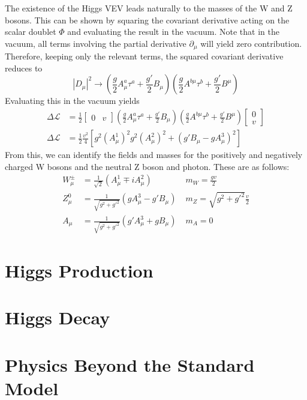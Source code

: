 The existence of the Higgs VEV leads naturally to the masses of the W and Z bosons. This can be shown by squaring the covariant 
derivative acting on the scalar doublet $\Phi$ and evaluating the result in the vacuum. Note that in the vacuum, all terms involving 
the partial derivative $\partial_{\mu}$ will yield zero contribution. Therefore, keeping only the relevant terms, the squared covariant 
derivative reduces to
\begin{equation}
    |D_{\mu}|^{2} \rightarrow (\frac{g}{2}A_{\mu}^{a}\tau^{a} +\frac{g'}{2}B_{\mu})(\frac{g}{2}A^{b\mu}\tau^{b} + \frac{g'}{2}B^{\mu})
    \label{covDerivSquared}
\end{equation}
Evaluating this in the vacuum yields
\begin{align}
    \Delta\mathcal{L} &= \frac{1}{2}
    \begin{bmatrix}0 & v
    \end{bmatrix}
    (\frac{g}{2}A_{\mu}^{a}\tau^{a} +\frac{g'}{2}B_{\mu})(\frac{g}{2}A^{b\mu}\tau^{b} + \frac{g'}{2}B^{\mu}) 
    \begin{bmatrix}
        0 \\ 
        v
    \end{bmatrix} \\ 
    \Delta\mathcal{L} &=
    \frac{1}{2}\frac{v^{2}}{4}[g^{2}(A_{\mu}^{1})^{2} g^{2}(A_{\mu}^{2})^{2} + (g'B_{\mu} - gA_{\mu}^{3})^{2}]
\end{align}
From this, we can identify the fields and masses for the positively and negatively charged W bosons and the neutral Z boson and photon. 
These are as follows:
\begin{align}
    W_{\mu}^{\pm} &= \frac{1}{\sqrt{2}}(A_{\mu}^{1} \mp iA_{\mu}^{2}) \; &m_{W} = \frac{gv}{2} \\
    Z_{\mu}^{0} &= \frac{1}{\sqrt{g^{2} + g'^{2}}}(gA_{\mu}^{3} - g'B_{\mu}) \; &m_{Z} = \sqrt{g^{2} + g'^{2}}\frac{v}{2} \\
    A_{\mu} &= \frac{1}{\sqrt{g^{2} + g'^{2}}}(g'A_{\mu}^{3} + gB_{\mu}) \; &m_{A} = 0
    \label{gaugeBosonsAndMasses}
\end{align}

\section{Higgs Production}

\section{Higgs Decay}

\section{Physics Beyond the Standard Model}

